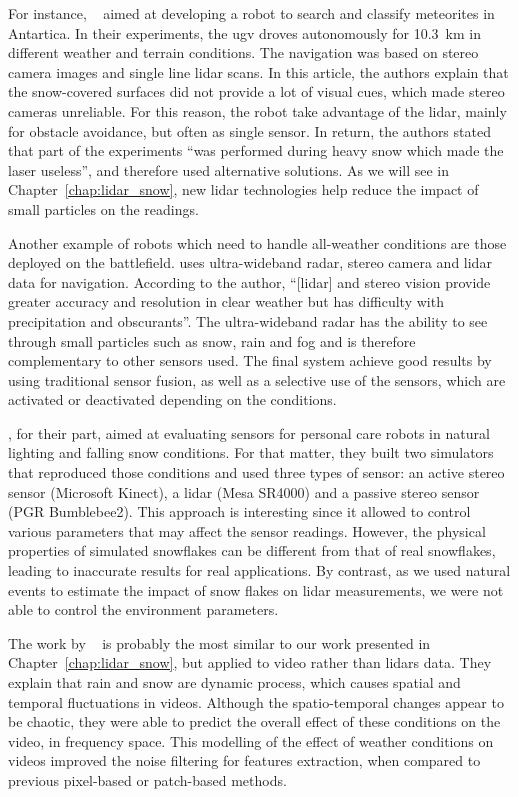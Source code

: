 For instance, ~\citet{Moorehead_1999_2122} aimed at developing a robot to search and classify meteorites in Antartica. In their experiments, the \gls*{ugv} droves autonomously for \SI{10.3}{\kilo\meter} in different weather and terrain conditions. The navigation was based on stereo camera images and single line \gls*{lidar} scans. In this article, the authors explain that the snow-covered surfaces did not provide a lot of visual cues, which made stereo cameras unreliable. For this reason, the robot take advantage of the \gls*{lidar}, mainly for obstacle avoidance, but often as single sensor. In return, the authors stated that part of the experiments \enquote{was performed during heavy snow which made the laser useless}, and therefore used alternative solutions. As we will see in Chapter~\ref{chap:lidar_snow}, new \gls*{lidar} technologies help reduce the impact of small particles on the readings. 

Another example of robots which need to handle all-weather conditions are those deployed on the battlefield. \citet{yamauchi2010fusing} uses ultra-wideband radar, stereo camera and \gls*{lidar} data for navigation. According to the author, \enquote{[\gls*{lidar}] and stereo vision provide greater accuracy and resolution in clear weather but has difficulty with precipitation and obscurants}. The ultra-wideband radar has the ability to see through small particles such as snow, rain and fog and is therefore complementary to other sensors used. The final system achieve good results by using traditional sensor fusion, as well as a selective use of the sensors, which are activated or deactivated depending on the conditions. 

\citet{sumi-arso-13}, for their part, aimed at evaluating sensors for personal care robots in natural lighting and falling snow conditions. For that matter, they built two simulators that reproduced those conditions and used three types of sensor: an active stereo sensor (Microsoft Kinect), a \gls*{lidar} (Mesa SR4000) and a passive stereo sensor (PGR Bumblebee2). This approach is interesting since it allowed to control various parameters that may affect the sensor readings. However, the physical properties of simulated snowflakes can be different from that of real snowflakes, leading to inaccurate results for real applications. By contrast, as we used natural events to estimate the impact of snow flakes on \gls*{lidar} measurements, we were not able to control the environment parameters.

The work by ~\citet{barnum2010analysis} is probably the most similar to our work presented in Chapter~\ref{chap:lidar_snow}, but applied to video rather than \gls*{lidar}s data. They explain that rain and snow are dynamic process, which causes spatial and temporal fluctuations in videos. Although the spatio-temporal changes appear to be chaotic, they were able to predict the overall effect of these conditions on the video, in frequency space. This modelling of the effect of weather conditions on videos improved the noise filtering for features extraction, when compared to previous pixel-based or patch-based methods.

